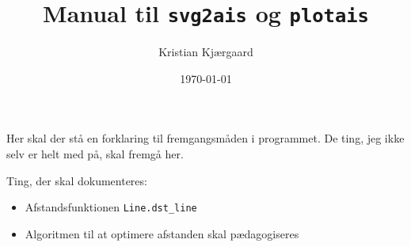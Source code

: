\documentclass{mypaper}
\title{Manual til \texttt{svg2ais} og \texttt{plotais}}
\author{Kristian Kjærgaard}
\date{\today}
\begin{document}
\maketitle

Her skal der stå en forklaring til fremgangsmåden i programmet. De
ting, jeg ikke selv er helt med på, skal fremgå her.

Ting, der skal dokumenteres:

\begin{itemize}
\item Afstandsfunktionen \texttt{Line.dst_line}
\item Algoritmen til at optimere afstanden skal pædagogiseres
\end{itemize}
\end{document}
